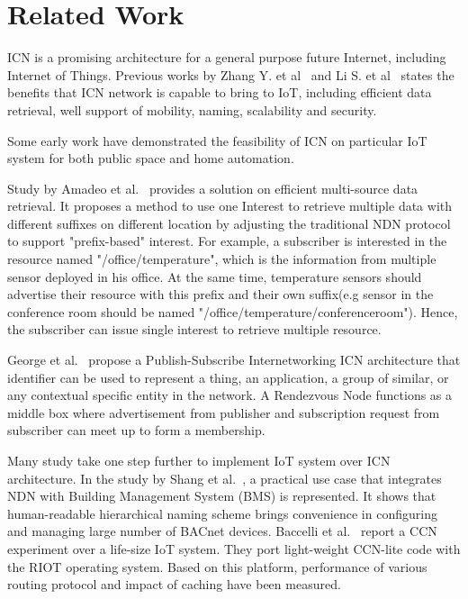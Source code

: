 \section{Related Work}
\label{sec:related}
ICN is a promising architecture for a general purpose future Internet, including Internet of Things. Previous works by Zhang Y. et al~\cite{zhang2013icn} and Li S. et al~\cite{compare_study} states the benefits that ICN network is capable to bring to IoT, including efficient data retrieval, well support of mobility, naming, scalability and security.

Some early work have demonstrated the feasibility of ICN on particular IoT system for both public space and home automation.  


Study by Amadeo et al.~\cite{amadeo2014multi} provides a solution on efficient multi-source data retrieval. It proposes a method to use one Interest to retrieve multiple data with different suffixes on different location by adjusting the traditional NDN protocol to support "prefix-based" interest. For example, a subscriber is interested in the resource named "/office/temperature", which is the information from multiple sensor deployed in his office. At the same time, temperature sensors should advertise their resource with this prefix and their own suffix(e.g sensor in the conference room should be named "/office/temperature/conferenceroom"). Hence, the subscriber can issue single interest to retrieve multiple resource.


George et al.~\cite{polyzos2015building} propose a Publish-Subscribe Internetworking ICN architecture
that identifier can be used to represent a thing, an application, a group of similar, or any contextual specific entity in the network. A Rendezvous Node functions as a middle box where advertisement from publisher and subscription request from subscriber can meet up to form a membership. 

Many study take one step further to implement IoT system over ICN architecture. In the study by Shang et al.~\cite{shang2014securing}, a practical use case that integrates NDN with Building Management System (BMS) is represented. It shows that human-readable hierarchical naming scheme brings convenience in configuring and managing large number of BACnet devices. Baccelli et al.~\cite{baccelli2014information} report a CCN experiment over a life-size IoT system. They port light-weight CCN-lite code with the RIOT operating system. Based on this platform, performance of various routing protocol and impact of caching have been measured.  

